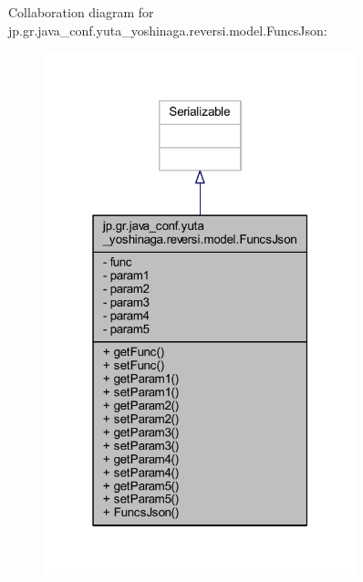 Collaboration diagram for jp.\+gr.\+java\+\_\+conf.\+yuta\+\_\+yoshinaga.\+reversi.\+model.\+Funcs\+Json\+:
\nopagebreak
\begin{figure}[H]
\begin{center}
\leavevmode
\includegraphics[width=256pt]{classjp_1_1gr_1_1java__conf_1_1yuta__yoshinaga_1_1reversi_1_1model_1_1_funcs_json__coll__graph}
\end{center}
\end{figure}
